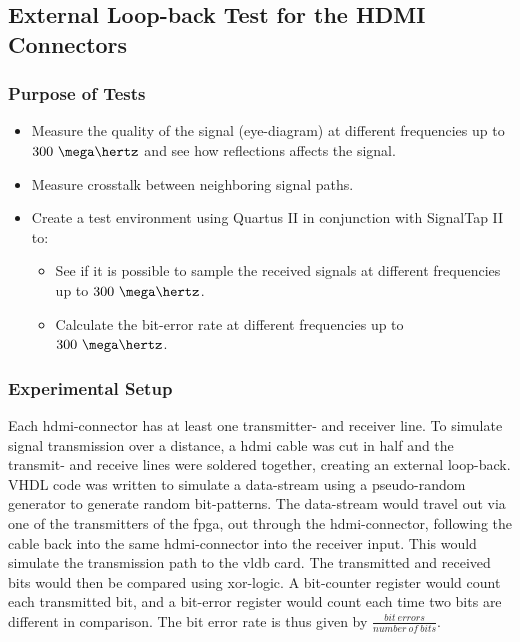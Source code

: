 \documentclass[main.tex]{subfiles}
\begin{document}
\subsection{External Loop-back Test for the HDMI Connectors}

\subsubsection{Purpose of Tests}

\begin{itemize}\setlength{\itemsep}{10pt}
\item Measure the quality of the signal (eye-diagram) at different frequencies up to $300~\mega\hertz$ and see how reflections affects the signal.
\item Measure crosstalk between neighboring signal paths.
\item Create a test environment using Quartus II in conjunction with SignalTap II to:
\begin{itemize}\setlength{\itemsep}{10pt}
  \item See if it is possible to sample the received signals at different frequencies up to $300~\mega\hertz$.
  \item Calculate the bit-error rate at different frequencies up to $300~\mega\hertz$.
\end{itemize}
\end{itemize}

\subsubsection{Experimental Setup}

Each \gls{hdmi}-connector has at least one transmitter- and receiver line. To simulate signal transmission over a distance, a \gls{hdmi} cable was cut in half and the transmit- and receive lines were soldered together, creating an external loop-back. VHDL code was written to simulate a data-stream using a pseudo-random generator to generate random bit-patterns. The data-stream would travel out via one of the transmitters of the \gls{fpga}, out through the \gls{hdmi}-connector, following the cable back into the same \gls{hdmi}-connector into the receiver input. This would simulate the transmission path to the \gls{vldb} card. The transmitted and received bits would then be compared using xor-logic. A bit-counter register would count each transmitted bit, and a bit-error register would count each time two bits are different in comparison. The bit error rate is thus given by $\frac{bit~errors}{number~of~bits}$.
\end{document}
